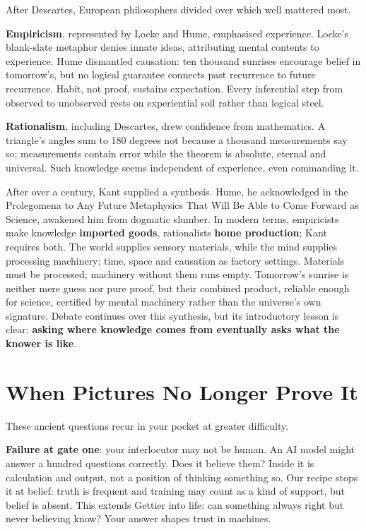 After Descartes, European philosophers divided over which well mattered most.

\textbf{Empiricism}, represented by Locke and Hume, emphasised experience. Locke's blank-slate metaphor denies innate ideas, attributing mental contents to experience. Hume dismantled causation: ten thousand sunrises encourage belief in tomorrow's, but no logical guarantee connects past recurrence to future recurrence. Habit, not proof, sustains expectation. Every inferential step from observed to unobserved rests on experiential soil rather than logical steel.

\textbf{Rationalism}, including Descartes, drew confidence from mathematics. A triangle's angles sum to 180 degrees not because a thousand measurements say so; measurements contain error while the theorem is absolute, eternal and universal. Such knowledge seems independent of experience, even commanding it.

After over a century, Kant supplied a synthesis. Hume, he acknowledged in the Prolegomena to Any Future Metaphysics That Will Be Able to Come Forward as Science, awakened him from dogmatic slumber. In modern terms, empiricists make knowledge \textbf{imported goods}, rationalists \textbf{home production}; Kant requires both. The world supplies sensory materials, while the mind supplies processing machinery: time, space and causation as factory settings. Materials must be processed; machinery without them runs empty. Tomorrow's sunrise is neither mere guess nor pure proof, but their combined product, reliable enough for science, certified by mental machinery rather than the universe's own signature. Debate continues over this synthesis, but its introductory lesson is clear: \textbf{asking where knowledge comes from eventually asks what the knower is like}.

\section{When Pictures No Longer Prove It}
These ancient questions recur in your pocket at greater difficulty.

\textbf{Failure at gate one}: your interlocutor may not be human. An AI model might answer a hundred questions correctly. Does it believe them? Inside it is calculation and output, not a position of thinking something so. Our recipe stops it at belief: truth is frequent and training may count as a kind of support, but belief is absent. This extends Gettier into life: can something always right but never believing know? Your answer shapes trust in machines.

